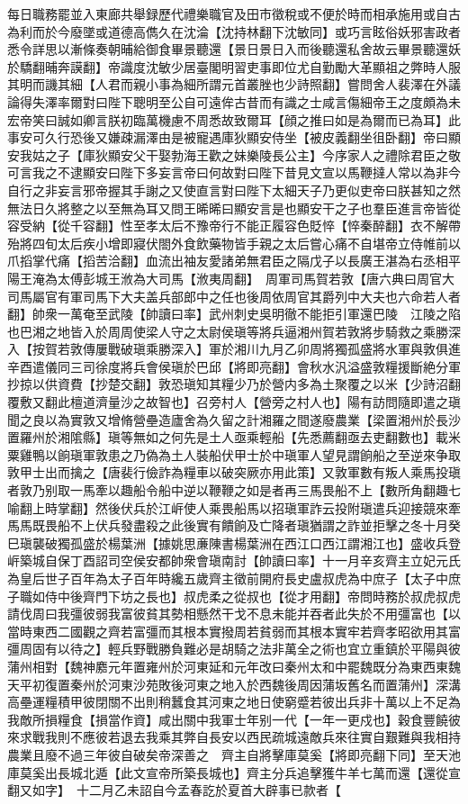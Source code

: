 每日職務罷並入東廊共舉録歷代禮樂職官及田市徵稅或不便於時而相承施用或自古為利而於今廢墜或道德高儁久在沈淪【沈持林翻下沈敏同】或巧言眩俗妖邪害政者悉令詳思以漸條奏朝晡給御食畢景聽還【景日景日入而後聽還私舍故云畢景聽還妖於驕翻晡奔謨翻】帝識度沈敏少居臺閣明習吏事即位尤自勤勵大革顯祖之弊時人服其明而譏其細【人君而親小事為細所謂元首叢脞也少詩照翻】嘗問舍人裴澤在外議論得失澤率爾對曰陛下聰明至公自可遠侔古昔而有識之士咸言傷細帝王之度頗為未宏帝笑曰誠如卿言朕初臨萬機慮不周悉故致爾耳【顔之推曰如是為爾而已為耳】此事安可久行恐後又嫌疎漏澤由是被寵遇庫狄顯安侍坐【被皮義翻坐徂卧翻】帝曰顯安我姑之子【庫狄顯安父干娶勃海王歡之妹樂陵長公主】今序家人之禮除君臣之敬可言我之不逮顯安曰陛下多妄言帝曰何故對曰陛下昔見文宣以馬鞭撻人常以為非今自行之非妄言邪帝握其手謝之又使直言對曰陛下太細天子乃更似吏帝曰朕甚知之然無法日久將整之以至無為耳又問王晞晞曰顯安言是也顯安干之子也羣臣進言帝皆從容受納【從千容翻】性至孝太后不豫帝行不能正履容色貶悴【悴秦醉翻】衣不解帶殆將四旬太后疾小增即寢伏閤外食飲藥物皆手親之太后嘗心痛不自堪帝立侍帷前以爪搯掌代痛【搯苦洽翻】血流出袖友愛諸弟無君臣之隔戊子以長廣王湛為右丞相平陽王淹為太傅彭城王浟為大司馬【浟夷周翻】　周軍司馬賀若敦【唐六典曰周官大司馬屬官有軍司馬下大夫盖兵部郎中之任也後周依周官其爵列中大夫也六命若人者翻】帥衆一萬奄至武陵【帥讀曰率】武州刺史吳明徹不能拒引軍還巴陵　江陵之陷也巴湘之地皆入於周周使梁人守之太尉侯瑱等將兵逼湘州賀若敦將步騎救之乘勝深入【按賀若敦傳屢戰破瑱乘勝深入】軍於湘川九月乙卯周將獨孤盛將水軍與敦俱進辛酉遣儀同三司徐度將兵會侯瑱於巴邱【將即亮翻】會秋水汎溢盛敦糧援斷絶分軍抄掠以供資費【抄楚交翻】敦恐瑱知其糧少乃於營内多為土聚覆之以米【少詩沼翻覆敷又翻此檀道濟量沙之故智也】召旁村人【營旁之村人也】陽有訪問隨即遣之瑱聞之良以為實敦又增脩營壘造廬舍為久留之計湘羅之間遂廢農業【梁置湘州於長沙置羅州於湘隂縣】瑱等無如之何先是土人亟乘輕船【先悉薦翻亟去吏翻數也】載米粟雞鴨以餉瑱軍敦患之乃偽為土人裝船伏甲士於中瑱軍人望見謂餉船之至逆來争取敦甲士出而擒之【唐裴行儉詐為糧車以破突厥亦用此策】又敦軍數有叛人乘馬投瑱者敦乃别取一馬牽以趣船令船中逆以鞭鞭之如是者再三馬畏船不上【數所角翻趣七喻翻上時掌翻】然後伏兵於江㟁使人乘畏船馬以招瑱軍詐云投附瑱遣兵迎接競來牽馬馬既畏船不上伏兵發盡殺之此後實有饋餉及亡降者瑱猶謂之詐並拒擊之冬十月癸巳瑱襲破獨孤盛於楊葉洲【據姚思亷陳書楊葉洲在西江口西江謂湘江也】盛收兵登㟁築城自保丁酉詔司空侯安都帥衆會瑱南討【帥讀曰率】十一月辛亥齊主立妃元氏為皇后世子百年為太子百年時纔五歲齊主徵前開府長史盧叔虎為中庶子【太子中庶子職如侍中後齊門下坊之長也】叔虎柔之從叔也【從才用翻】帝問時務於叔虎叔虎請伐周曰我彊彼弱我富彼貧其勢相懸然干戈不息未能并吞者此失於不用彊富也【以當時東西二國觀之齊若富彊而其根本實撥周若貧弱而其根本實牢若齊孝昭欲用其富彊周固有以待之】輕兵野戰勝負難必是胡騎之法非萬全之術也宜立重鎮於平陽與彼蒲州相對【魏神䴥元年置雍州於河東延和元年改曰秦州太和中罷魏既分為東西東魏天平初復置秦州於河東沙苑敗後河東之地入於西魏後周因蒲坂舊名而置蒲州】深溝高壘運糧積甲彼閉關不出則稍蠶食其河東之地日使窮蹙若彼出兵非十萬以上不足為我敵所損糧食【損當作資】咸出關中我軍士年别一代【一年一更戍也】穀食豐饒彼來求戰我則不應彼若退去我乘其弊自長安以西民疏城遠敵兵來往實自艱難與我相持農業且廢不過三年彼自破矣帝深善之　齊主自將擊庫莫奚【將即亮翻下同】至天池庫莫奚出長城北遁【此文宣帝所築長城也】齊主分兵追擊獲牛羊七萬而還【還從宣翻又如字】　十二月乙未詔自今孟春訖於夏首大辟事已款者【